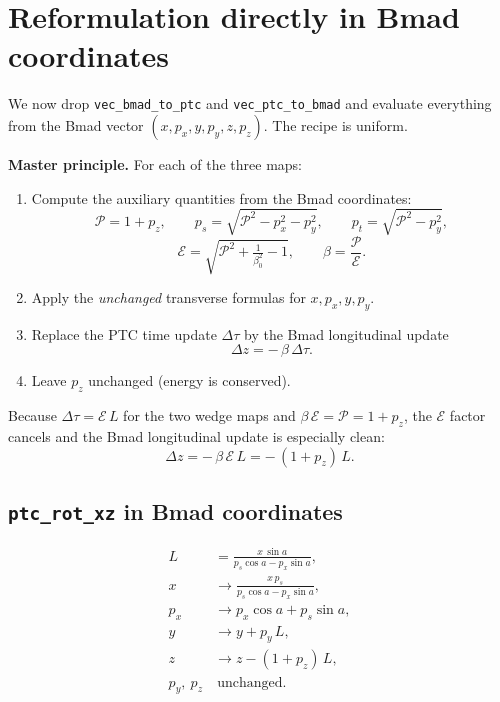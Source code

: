 \documentclass[11pt]{article}
\newcommand{\code}[1]{\texttt{#1}}
\newcommand{\ptcE}{\mathcal{E}}          %
\newcommand{\Pmag}{\mathcal{P}}          %
\begin{document}
\section{Reformulation directly in Bmad coordinates}

We now drop \code{vec\_bmad\_to\_ptc} and \code{vec\_ptc\_to\_bmad} and evaluate
everything from the Bmad vector $(x, p_x, y, p_y, z, p_z)$. The recipe is uniform.

\begin{keybox}
\textbf{Master principle.} For each of the three maps:
\begin{enumerate}
\item Compute the auxiliary quantities from the Bmad coordinates:
  \begin{equation}
    \Pmag = 1 + p_z, \qquad
    p_s = \sqrt{\Pmag^2 - p_x^2 - p_y^2}, \qquad
    p_t = \sqrt{\Pmag^2 - p_y^2},
  \end{equation}
  \begin{equation}
    \ptcE = \sqrt{\Pmag^2 + \tfrac{1}{\beta_0^2} - 1}, \qquad
    \beta = \frac{\Pmag}{\ptcE} .
  \end{equation}
\item Apply the \emph{unchanged} transverse formulas for $x, p_x, y, p_y$.
\item Replace the PTC time update $\Delta\tau$ by the Bmad longitudinal update
  \begin{equation}
    \Delta z = -\,\beta\,\Delta\tau .
  \end{equation}
\item Leave $p_z$ unchanged (energy is conserved).
\end{enumerate}
\end{keybox}

Because $\Delta\tau = \ptcE\,L$ for the two wedge maps and $\beta\,\ptcE = \Pmag
= 1 + p_z$, the $\ptcE$ factor cancels and the Bmad longitudinal update is
especially clean:
\begin{equation}
  \Delta z = -\,\beta\,\ptcE\,L = -\,(1 + p_z)\,L .
\end{equation}

\subsection{\code{ptc\_rot\_xz} in Bmad coordinates}
\begin{align}
  L        &= \frac{x\,\sin a}{p_s\cos a - p_x\sin a}, \\
  x        &\to \frac{x\,p_s}{p_s\cos a - p_x\sin a}, \\
  p_x      &\to p_x\cos a + p_s\sin a, \\
  y        &\to y + p_y\,L, \\
  z        &\to z - (1 + p_z)\,L, \\
  p_y,\ p_z &\ \text{unchanged.}
\end{align}
\end{document}
